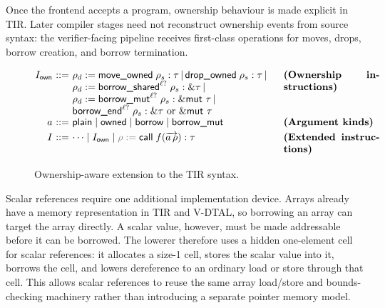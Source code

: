 
Once the frontend accepts a program, ownership behaviour is made explicit in TIR. Later compiler stages need not reconstruct ownership events from source syntax: the verifier-facing pipeline receives first-class operations for moves, drops, borrow creation, and borrow termination.

\begin{figure}[H]
{\small
\[
\renewcommand{\arraystretch}{1.09}
\begin{array}{@{}r@{\ }c@{\ }l@{\hspace{1.2em}}p{0.28\textwidth}@{}}
  I_\mathsf{own} & ::= &
  \parbox[t]{0.58\textwidth}{
    $\rho_d := \textsf{move\_owned}\; \rho_s : \tau \,|\, \textsf{drop\_owned}\; \rho_s : \tau \,|\, {}$\\
    $\rho_d := \textsf{borrow\_shared}^{\ell?}\; \rho_s : \&\tau \,|\, {}$\\
    $\rho_d := \textsf{borrow\_mut}^{\ell?}\; \rho_s : \&\textsf{mut }\tau \,|\, {}$\\
    $\textsf{borrow\_end}^{\ell?}\; \rho_s : \&\tau \text{ or } \&\textsf{mut }\tau$
  }
  & \textbf{(Ownership instructions)} \\[4pt]
  a & ::= &
  \textsf{plain} \mid \textsf{owned} \mid \textsf{borrow} \mid \textsf{borrow\_mut}
  & \textbf{(Argument kinds)} \\[2pt]
  I & ::= &
  \cdots \mid I_\mathsf{own} \mid \optclause{\rho :=}\; \textsf{call}\; f(\overrightarrow{a\,\rho}) : \tau
  & \textbf{(Extended instructions)}
\end{array}
\]
}
\caption{Ownership-aware extension to the TIR syntax.}
\label{fig:tir-ownership-forms}
\end{figure}

Scalar references require one additional implementation device. Arrays already have a memory representation in TIR and V-DTAL, so borrowing an array can target the array directly. A scalar value, however, must be made addressable before it can be borrowed. The lowerer therefore uses a hidden one-element cell for scalar references: it allocates a size-1 cell, stores the scalar value into it, borrows the cell, and lowers dereference to an ordinary load or store through that cell. This allows scalar references to reuse the same array load/store and bounds-checking machinery rather than introducing a separate pointer memory model.

